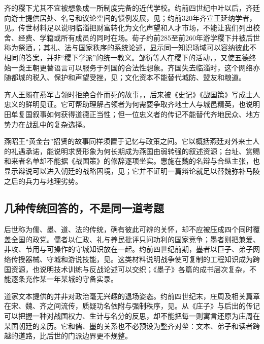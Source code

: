 齐的稷下尤其不宜被想象成一所制度完备的近代学校。约前四世纪中叶以后，齐廷向游士提供居处、名号和议论空间的惯例发展，见；约前320年齐宣王延纳学者，见。传世材料足以说明临淄把财富转化为文化声望和人才市场，不能让我们列出校舍、经费、学籍或所有成员的同时在场。荀子约前285至前260年游学稷下并被后世称为祭酒，；其礼、法与国家秩序的系统论述，显示同一知识场域可以容纳彼此不相同的答案，并非“稷下学派”的统一教义。邹衍等人在稷下的活动，，又使五德终始一类王朝更替语言可以服务于列国的合法性想象。齐国失去临淄时，这个网络亦随都城的税入、保护和声望受挫，见；文化资本不能替代城防、盟友和粮道。

齐人王蠋在燕军占领时拒绝合作而死的故事，，后来被《史记》《战国策》写成士人忠义的鲜明见证。它可帮助理解占领者为何需要争取齐地士人与城邑精英，也说明田单复国叙事如何获得道德正当性；但一位忠义者的传记不能替代齐地民众、地方势力在战乱中的复杂选择。

燕昭王“黄金台”招贤的故事同样须置于记忆与政策之间。它以概括燕廷对外来士人的礼遇承诺，能说明求贤形象为何长期成为燕国由弱转强的叙述资源；台址、赏赐和来者名单却不能据《战国策》的修辞逐项坐实。惠施在魏的名辩与合纵主张，也显示辩说可以进入朝廷的战略困境，见；它并不证明一篇辩论就足以替魏弥补马陵之后的兵力与地理劣势。

\subsection{几种传统回答的，不是同一道考题}

后世称为儒、墨、道、法的传统，确有彼此可辨的关怀，却不应被压成四个同时覆盖全国的政党。儒者以仁政、礼与养民批评只问功利的国家竞争；墨者则把兼爱、非攻、节用与可操作的守城知识放在一起。约前四世纪前期，墨者以巨子、弟子网络传授器械、守城和游说技能，见。这类材料说明战争使可复制的工程知识成为跨国资源，也说明技术训练与反战论述可以交织；《墨子》各篇的成书层次复杂，不能逐条充作某一年某城的守备实录。

道家文本提供的并非对政治毫无兴趣的退场姿态。约前四世纪末，庄周及相关篇章在宋、魏、齐之间流传，质疑功名依附与强制秩序，见。从《庄子》与后出的传记可以把握一种对战国权力、生计与名分的反思，却不能把每一则寓言还原为庄周在某国朝廷的亲历。它和儒、墨的关系也不必预设为整齐对垒：文本、弟子和读者跨越的道路，比后世的门派边界更不规整。

